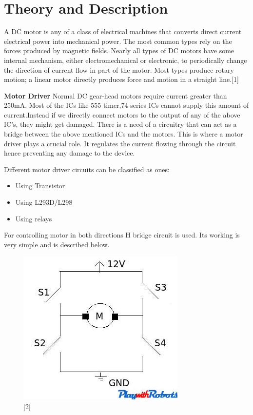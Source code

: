 \documentclass[11pt,a4paper]{article}
\begin{document}
	\newpage
	\section{Theory and Description}
	A DC motor is any of a class of electrical machines that converts direct current electrical power into mechanical power. The most common types rely on the forces produced by magnetic fields. Nearly all types of DC motors have some internal mechanism, either electromechanical or electronic, to periodically change the direction of current flow in part of the motor. Most types produce rotary motion; a linear motor directly produces force and motion in a straight line.[1]
	
	\vspace{0.5cm}
	\flushleft
	\textbf{Motor Driver}
	\vspace{0.3cm}
	\newline
	Normal DC gear-head motors require current greater than 250mA. Most of the ICs like 555 timer,74 series ICs cannot supply this amount of current.Instead if we directly connect motors to the output of any of the above IC's, they might get damaged. There is a need of a circuitry that can act as a bridge between the above mentioned ICs and the motors. This is where a motor driver plays a crucial role. It regulates the current flowing through the circuit hence preventing any damage to the device.
	
	Different motor driver circuits can be classified as ones:
	\begin{itemize}
		\item Using Transistor
		\item Using L293D/L298
		\item Using relays
	\end{itemize}
    
    \newpage
    For controlling motor in both directions H bridge circuit is used. Its working is very simple and is described below.
    \begin{figure}[h!]
    	\includegraphics[scale=1]{hb.jpg}
    	\centering
    	\caption{[2]}
    \end{figure} 
    
\end{document}
